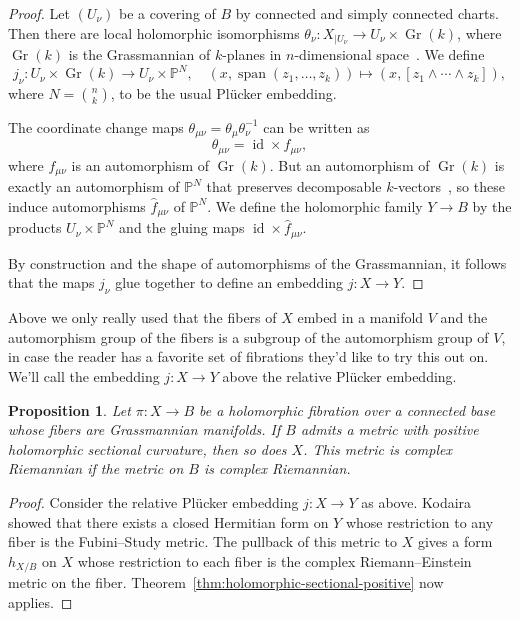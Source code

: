 \documentclass[10pt,a4paper]{amsart}
\newtheorem{prop}[theo]{Proposition}
\theoremstyle{definition}
\newcommand{\kk}[1]{\mathbb{#1}}
\DeclareMathOperator{\Span}{span}
\DeclareMathOperator{\Gr}{Gr}
\DeclareMathOperator{\id}{id}
\def\kahler{complex Riemannian}
\def\kahlerEinstein{complex Riemann--Einstein}
\begin{document}
\begin{proof}
Let $(U_{\nu})$ be a covering of $B$ by connected and simply connected charts.
Then there are local holomorphic isomorphisms $\theta_{\nu} : X_{|U_{\nu}} \to U_{\nu} \times \Gr(k)$, where $\Gr(k)$ is the Grassmannian of $k$-planes in $n$-dimensional space~\cite{fischer1965lokal}.
We define
\[
  j_{\nu} : U_{\nu} \times \Gr(k) \to U_{\nu} \times \kk P^{N},
  \quad
  (x, \Span(z_{1}, \ldots, z_{k}))
  \mapsto
  (x, [z_{1} \wedge \cdots \wedge z_{k}]),
\]
where $N = \binom nk$,
to be the usual Pl\"ucker embedding.

The coordinate change maps $\theta_{\mu\nu} = \theta_{\mu}\theta_{\nu}^{-1}$ can be written as
\[
\theta_{\mu\nu} = \id \times f_{\mu\nu},
\]
where $f_{\mu\nu}$ is an automorphism of $\Gr(k)$.
But an automorphism of $\Gr(k)$ is exactly an automorphism of $\kk P^{N}$ that preserves decomposable $k$-vectors~\cite{cowen1989automorphisms}, so these induce automorphisms $\hat f_{\mu\nu}$ of $\kk P^{N}$. We define the holomorphic family $Y \to B$ by the products $U_{\nu} \times \kk P^{N}$ and the gluing maps $\id \times \hat f_{\mu\nu}$.

By construction and the shape of automorphisms of the Grassmannian, it follows that the maps $j_{\nu}$ glue together to define an embedding $j : X \to Y$.
\end{proof}

Above we only really used that the fibers of $X$ embed in a manifold $V$ and the automorphism group of the fibers is a subgroup of the automorphism group of $V$, in case the reader has a favorite set of fibrations they'd like to try this out on.
We'll call the embedding $j : X \to Y$ above the relative Pl\"ucker embedding.

\begin{prop}
Let $\pi : X \to B$ be a holomorphic fibration over a connected base whose fibers are Grassmannian manifolds.
If $B$ admits a metric with positive holomorphic sectional curvature, then so does $X$.
This metric is \kahler{} if the metric on $B$ is \kahler{}.
\end{prop}

\begin{proof}
Consider the relative Pl\"ucker embedding $j : X \to Y$ as above.
Kodaira~\cite[Section 4(V)]{kodaira-embedding} showed that there exists a closed Hermitian form on $Y$ whose restriction to any fiber is the Fubini--Study metric.
The pullback of this metric to $X$ gives a form $h_{X/B}$ on $X$ whose restriction to each fiber is the \kahlerEinstein{} metric on the fiber.
Theorem~\ref{thm:holomorphic-sectional-positive} now applies.
\end{proof}
\end{document}
